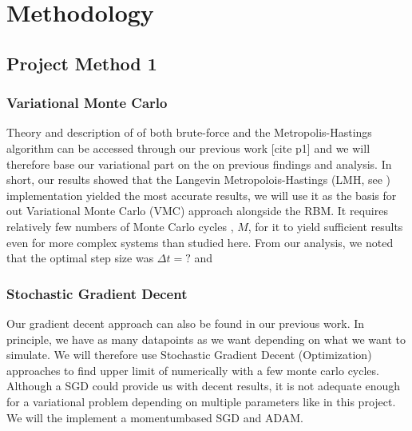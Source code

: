 \section{Methodology}\label{sec:Method}

\subsection{Project Method 1}\label{sec:project method}

\subsubsection{Variational Monte Carlo}

Theory and description of of both brute-force and the Metropolis-Hastings algorithm can be accessed through our previous work [cite p1] and we will therefore base our variational part on the on previous findings and analysis. In short, our results showed that the Langevin Metropolois-Hastings (LMH, see \citep{project1}) implementation yielded the most accurate results, we will use it as the basis for out Variational Monte Carlo (VMC) approach alongside the RBM. It requires relatively few numbers of Monte Carlo cycles , $M$, for it to yield sufficient results even for more complex systems than studied here. From our analysis, we noted that the optimal step size was $\Delta t = ?$ and 


\subsubsection{Stochastic Gradient Decent}

Our gradient decent approach can also be found in our previous work. In principle, we have as many datapoints as we want depending on what we want to simulate. We will therefore use Stochastic Gradient Decent (Optimization) approaches to find upper limit of numerically with a few monte carlo cycles. Although a SGD could provide us with decent results, it is not adequate enough for a variational problem depending on multiple parameters like in this project. We will the implement a momentumbased SGD and ADAM. 

